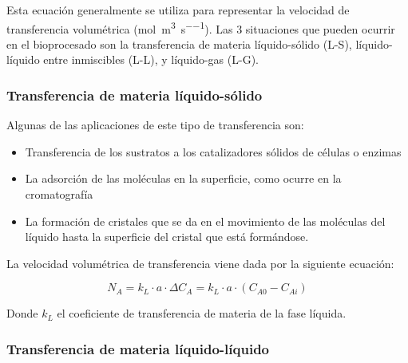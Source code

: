 \documentclass{AsignaturaResumen}
\begin{document}
Esta ecuación generalmente se utiliza para representar la velocidad de transferencia volumétrica (\unit{\mole\per\m\cubed\per\s}). Las 3 situaciones que pueden ocurrir en el bioprocesado son la transferencia de materia líquido-sólido (L-S), líquido-líquido entre inmiscibles (L-L), y líquido-gas (L-G).

\subsubsection{Transferencia de materia líquido-sólido}


Algunas de las aplicaciones de este tipo de transferencia son:

\begin{itemize}
    \item Transferencia de los sustratos a los catalizadores sólidos de células o enzimas
    \item La adsorción de las moléculas en la superficie, como ocurre en la cromatografía
    \item La formación de cristales que se da en el movimiento de las moléculas del líquido hasta la superficie del cristal que está formándose.
\end{itemize}

La velocidad volumétrica de transferencia viene dada por la siguiente ecuación:

\begin{equation}
    N_{A} = k_{L} \cdot a \cdot \Delta C_{A} = k_{L} \cdot a \cdot (C_{A0} - C_{Ai})
\end{equation}

Donde $k_{L}$ el coeficiente de transferencia de materia de la fase líquida.

\subsubsection{Transferencia de materia líquido-líquido}
\end{document}
